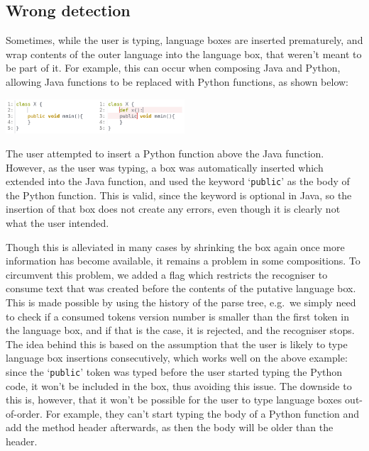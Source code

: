 \documentclass[sigplan,screen]{acmart}\settopmatter{printfolios=true,printccs=false,printacmref=false}
\newcommand{\qtt}[1]{`\texttt{#1}'\xspace}
\begin{document}
\subsection{Wrong detection}

Sometimes, while the user is typing, language boxes are inserted prematurely,
and wrap contents of the outer language into the language box, that weren't
meant to be part of it.
For example, this can occur when composing Java and Python,
allowing Java functions to be replaced with Python functions, as shown below:

\begin{center}
\includegraphics[width=0.50\textwidth]{images/autobox_limitjavapy.png}
\end{center}

The user attempted to insert a Python function above the Java function.
However, as the user was typing, a box was automatically inserted which
extended into the Java function, and used the keyword \qtt{public} as the body
of the Python function.  This is valid, since the keyword is optional in Java,
so the insertion of that box does not create any errors, even though it is
clearly not what the user intended.

Though this is alleviated in many cases by shrinking the box again once more
information has become available, it remains a problem in some compositions.
To circumvent this problem, we added a flag which restricts the recogniser
to consume text that was created before the contents of the putative language
box. This is made possible by using the history of the parse tree, e.g.~we simply
need to check if a consumed tokens version number is smaller than the first token
in the language box, and if that is the case, it is rejected, and the recogniser
stops.
The idea behind this is based on the assumption that the user is likely to type
language box insertions consecutively, which works well on the above example:
since the \qtt{public} token was
typed before the user started typing the Python code, it won't be included in
the box, thus avoiding this issue. The downside to this is, however, that it won't be possible for
the user to type language boxes out-of-order.  For example, they can't start
typing the body of a Python function and add the method header afterwards, as
then the body will be older than the header.
\end{document}
